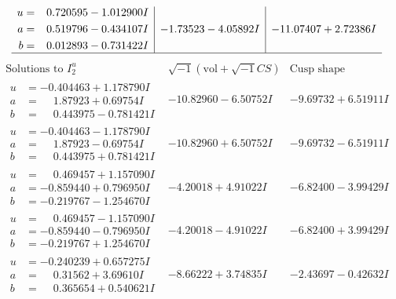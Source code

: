 \documentclass[1p]{elsarticle_modified}
\theoremstyle{definition}
\newcommand{\I}{\sqrt{-1}}
\begin{document}
$$\begin{array}{c|c|c}
\begin{aligned}
u &= \phantom{-}0.720595 - 1.012900 I \\
a &= \phantom{-}0.519796 - 0.434107 I \\
b &= \phantom{-}0.012893 - 0.731422 I\end{aligned}
 & -1.73523 - 4.05892 I & -11.07407 + 2.72386 I\\
 \hline 
 \end{array}$$\newpage$$\begin{array}{c|c|c}  
\text{Solutions to }I^u_{2}& \I (\text{vol} + \sqrt{-1}CS) & \text{Cusp shape}\\
 \hline 
\begin{aligned}
u &= -0.404463 + 1.178790 I \\
a &= \phantom{-}1.87923 + 0.69754 I \\
b &= \phantom{-}0.443975 - 0.781421 I\end{aligned}
 & -10.82960 - 6.50752 I & -9.69732 + 6.51911 I \\ \hline\begin{aligned}
u &= -0.404463 - 1.178790 I \\
a &= \phantom{-}1.87923 - 0.69754 I \\
b &= \phantom{-}0.443975 + 0.781421 I\end{aligned}
 & -10.82960 + 6.50752 I & -9.69732 - 6.51911 I \\ \hline\begin{aligned}
u &= \phantom{-}0.469457 + 1.157090 I \\
a &= -0.859440 + 0.796950 I \\
b &= -0.219767 - 1.254670 I\end{aligned}
 & -4.20018 + 4.91022 I & -6.82400 - 3.99429 I \\ \hline\begin{aligned}
u &= \phantom{-}0.469457 - 1.157090 I \\
a &= -0.859440 - 0.796950 I \\
b &= -0.219767 + 1.254670 I\end{aligned}
 & -4.20018 - 4.91022 I & -6.82400 + 3.99429 I \\ \hline\begin{aligned}
u &= -0.240239 + 0.657275 I \\
a &= \phantom{-}0.31562 + 3.69610 I \\
b &= \phantom{-}0.365654 + 0.540621 I\end{aligned}
 & -8.66222 + 3.74835 I & -2.43697 - 0.42632 I \\ \hline\begin{aligned}

\end{aligned}
\end{array}$$
\end{document}
